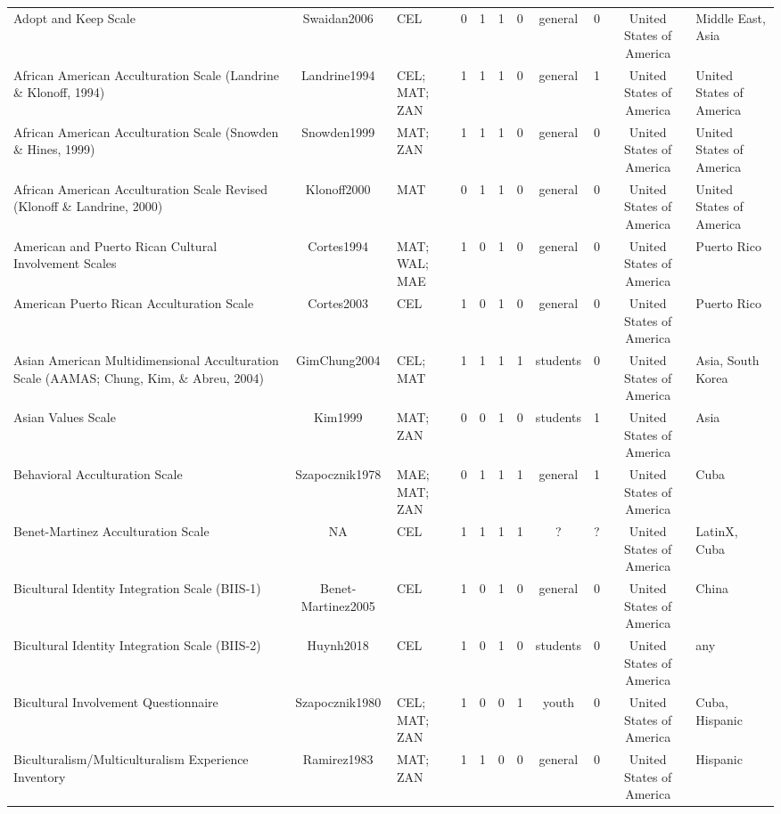 \begin{longtable}[l]{lclclclclcl}
Adopt and Keep Scale & Swaidan2006 & CEL & 0 & 1 & 1 & 0 & general & 0 & United States of America & Middle East, Asia\\
African American Acculturation Scale (Landrine \& Klonoff, 1994) & Landrine1994 & CEL; MAT; ZAN & 1 & 1 & 1 & 0 & general & 1 & United States of America & United States of America\\
African American Acculturation Scale (Snowden \& Hines, 1999) & Snowden1999 & MAT; ZAN & 1 & 1 & 1 & 0 & general & 0 & United States of America & United States of America\\
African American Acculturation Scale Revised (Klonoff \& Landrine, 2000) & Klonoff2000 & MAT & 0 & 1 & 1 & 0 & general & 0 & United States of America & United States of America\\
American and Puerto Rican Cultural Involvement Scales & Cortes1994 & MAT; WAL; MAE & 1 & 0 & 1 & 0 & general & 0 & United States of America & Puerto Rico\\
American Puerto Rican Acculturation Scale & Cortes2003 & CEL & 1 & 0 & 1 & 0 & general & 0 & United States of America & Puerto Rico\\
Asian American Multidimensional Acculturation Scale (AAMAS; Chung, Kim, \& Abreu, 2004) & GimChung2004 & CEL; MAT & 1 & 1 & 1 & 1 & students & 0 & United States of America & Asia, South Korea\\
Asian Values Scale & Kim1999 & MAT; ZAN & 0 & 0 & 1 & 0 & students & 1 & United States of America & Asia\\
Behavioral Acculturation Scale & Szapocznik1978 & MAE; MAT; ZAN & 0 & 1 & 1 & 1 & general & 1 & United States of America & Cuba\\
Benet-Martinez Acculturation Scale & NA & CEL & 1 & 1 & 1 & 1 & ? & ? & United States of America & LatinX, Cuba\\
Bicultural Identity Integration Scale (BIIS-1) & Benet-Martinez2005 & CEL & 1 & 0 & 1 & 0 & general & 0 & United States of America & China\\
Bicultural Identity Integration Scale (BIIS-2) & Huynh2018 & CEL & 1 & 0 & 1 & 0 & students & 0 & United States of America & any\\
Bicultural Involvement Questionnaire & Szapocznik1980 & CEL; MAT; ZAN & 1 & 0 & 0 & 1 & youth & 0 & United States of America & Cuba, Hispanic\\
Biculturalism/Multiculturalism Experience Inventory & Ramirez1983 & MAT; ZAN & 1 & 1 & 0 & 0 & general & 0 & United States of America & Hispanic\\

\end{longtable}
